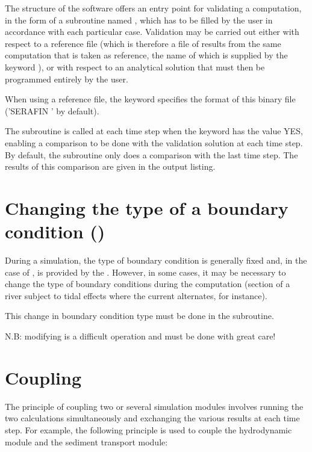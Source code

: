 The structure of the  software offers an entry point for validating
a computation, in the form of a subroutine named ,
which has to be filled by the user in accordance with each particular case.
Validation may be carried out either with respect to a reference file
(which is therefore a file of results from the same computation that is taken
as reference, the name of which is supplied by the keyword
), or with respect to an analytical solution that must
then be programmed entirely by the user.

When using a reference file, the keyword 
specifies the format of this binary file ('SERAFIN ' by default).

The  subroutine is called at each time step
when the keyword  has the value YES,
enabling a comparison to be done with the validation solution at each time step.
By default, the  subroutine only does a comparison
with the last time step.
The results of this comparison are given in the output listing.


\section{Changing the type of a boundary condition ()}
\label{sec:chang:type:bc:propin}
During a simulation, the type of boundary condition is generally fixed and, in
the case of , is provided by the .
However, in some cases, it may be necessary to change the type of boundary
conditions during the computation (section of a river subject to tidal effects
where the current alternates, for instance).

This change in boundary condition type must be done in the
 subroutine.

N.B: modifying  is a difficult operation
and must be done with great care!


\section{Coupling}
\label{sec:coupling}

The principle of coupling two or several simulation modules involves
running the two calculations simultaneously and exchanging the various results
at each time step.
For example, the following principle is used to couple the hydrodynamic module
and the sediment transport module:

